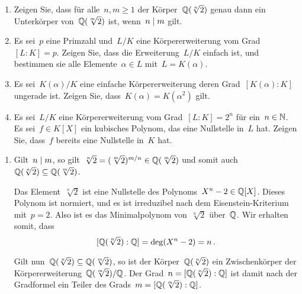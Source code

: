 \documentclass{scrartcl}
\begin{document}
\begin{exercise}
  \begin{enumerate}
    \item
      Zeigen Sie, dass für alle~$n, m \geq 1$ der Körper~$\mathbb{Q}(\sqrt[n]{2})$ genau dann ein Unterkörper von~$\mathbb{Q}(\sqrt[m]{2})$ ist, wenn~$n \mid m$ gilt.
    \item
      Es sei~$p$ eine Primzahl und~$L/K$ eine Körpererweiterung vom Grad~$[L : K] = p$.
      Zeigen Sie, dass die Erweiterung~$L/K$ einfach ist, und bestimmen sie alle Elemente~$\alpha \in L$ mit~$L = K(\alpha)$.
    \item
      Es sei~$K(\alpha)/K$ eine einfache Körpererweiterung deren Grad~$[K(\alpha) : K]$ ungerade ist.
      Zeigen Sie, dass~$K(\alpha) = K(\alpha^2)$ gilt.
    \item
      Es sei~$L/K$ eine Körpererweiterung vom Grad~$[L : K] = 2^n$ für ein~$n \in \mathbb{N}$.
      Es sei~$f \in K[X]$ ein kubisches Polynom, das eine Nullstelle in~$L$ hat.
      Zeigen Sie, dass~$f$ bereits eine Nullstelle in~$K$ hat.
  \end{enumerate}
\end{exercise}

\begin{solution}
  \begin{enumerate}
    \item
      Gilt~$n \mid m$, so gilt~$\sqrt[n]{2} = ( \sqrt[m]{2} )^{m/n} \in \mathbb{Q}( \sqrt[m]{2} )$ und somit auch~$\mathbb{Q}( \sqrt[n]{2} ) \subseteq \mathbb{Q}( \sqrt[m]{2} )$.

      Das Element~$\sqrt[n]{2}$ ist eine Nullstelle des Polynoms~$X^n - 2 \in \mathbb{Q}[X]$.
      Dieses Polynom ist normiert, und es ist irreduzibel nach dem Eisenstein-Kriterium mit~$p = 2$.
      Also ist es das Minimalpolynom von~$\sqrt[n]{2}$ über~$\mathbb{Q}$.
      Wir erhalten somit, dass
      \[
        [\mathbb{Q}(\sqrt[n]{2}) : \mathbb{Q}]
        =
        \deg(X^n - 2)
        =
        n \,.
      \]

      Gilt nun~$\mathbb{Q}( \sqrt[n]{2} ) \subseteq \mathbb{Q}( \sqrt[m]{2} )$, so ist der Körper~$\mathbb{Q}( \sqrt[n]{2} )$ ein Zwischenkörper der Körpererweiterung~$\mathbb{Q}( \sqrt[m]{2} ) / \mathbb{Q}$.
      Der Grad~$n = [ \mathbb{Q}( \sqrt[n]{2} ) : \mathbb{Q} ]$ ist damit nach der Gradformel ein Teiler des Grads~$m = [ \mathbb{Q}( \sqrt[m]{2} ) : \mathbb{Q} ]$.
  \end{enumerate}
\end{solution}
\end{document}
